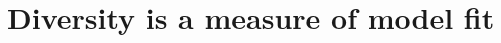 \documentclass[
	twoside=false, %
]{kaobook}
\begin{document}

\section{Diversity is a measure of model fit}
\end{document}
